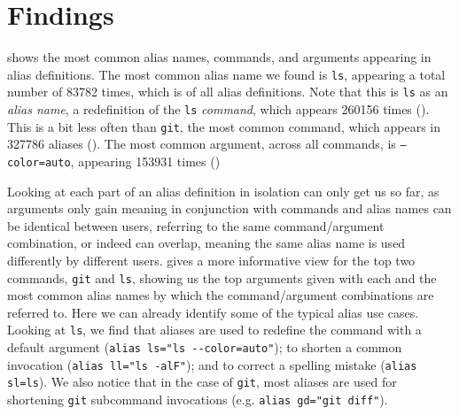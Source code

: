 \section{Findings}



 shows the most common alias names, commands, and arguments appearing in alias definitions.
The most common alias name we found is \texttt{ls}, appearing a total number of \num{83782} times, which is  of all alias definitions.
Note that this is \texttt{ls} as an \emph{alias name}, a redefinition of the \texttt{ls} \emph{command}, which appears \num{260156} times ().
This is a bit less often than \texttt{git}, the most common command, which appears in \num{327786} aliases ().
The most common argument, across all commands, is \texttt{--color=auto}, appearing \num{153931} times ()



Looking at each part of an alias definition in isolation can only get us so far, as arguments only gain meaning in conjunction with commands and alias names can be identical between users, referring to the same command/argument combination, or indeed can overlap, meaning the same alias name is used differently by different users.
 gives a more informative view for the top two commands, \texttt{git} and \texttt{ls}, showing us the top arguments given with each and the most common alias names by which the command/argument combinations are referred to.
Here we can already identify some of the typical alias use cases.
Looking at \texttt{ls}, we find that aliases are used
to redefine the command with a default argument (\verb|alias ls="ls --color=auto"|);
to shorten a common invocation (\verb|alias ll="ls -alF"|);
and to correct a spelling mistake (\verb|alias sl=ls|).
We also notice that in the case of \texttt{git}, most aliases are used for shortening \texttt{git} subcommand invocations (e.g. \verb|alias gd="git diff"|).

